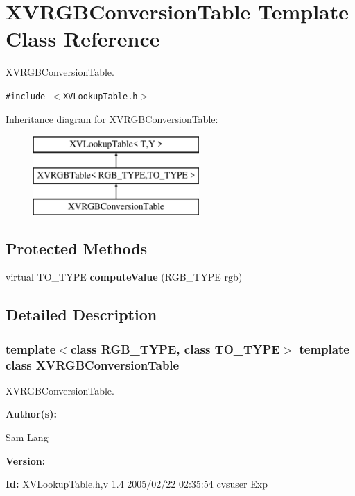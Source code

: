 \hypertarget{class_XVRGBConversionTable}{
\section{XVRGBConversion\-Table  Template Class Reference}
\label{XVRGBConversionTable}
}
XVRGBConversion\-Table. 


{\tt \#include $<$XVLookup\-Table.h$>$}

Inheritance diagram for XVRGBConversion\-Table:\begin{figure}[H]
\begin{center}
\leavevmode
\includegraphics[height=3cm]{class_XVRGBConversionTable}
\end{center}
\end{figure}
\subsection*{Protected Methods}
\begin{CompactItemize}
\item 
virtual TO\_\-TYPE {\bf compute\-Value} (RGB\_\-TYPE rgb)
\end{CompactItemize}


\subsection{Detailed Description}
\subsubsection*{template$<$class RGB\_\-TYPE, class TO\_\-TYPE$>$  template class XVRGBConversion\-Table}

XVRGBConversion\-Table.

\begin{Desc}
\item[{\bf Author(s): }]\par
 Sam Lang \end{Desc}
\begin{Desc}
\item[{\bf Version: }]\par
 \end{Desc}
\begin{Desc}
\item[{\bf Id: }] XVLookup\-Table.h,v 1.4 2005/02/22 02:35:54 cvsuser Exp \end{Desc}



